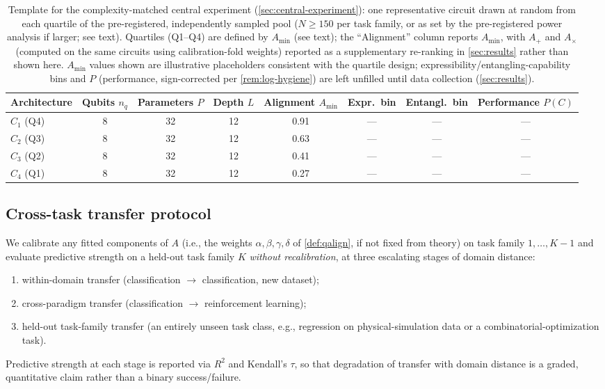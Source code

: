 \documentclass[11pt]{article}
\begin{document}
\begin{table}[htbp]
\centering
\caption{Template for the complexity-matched central experiment (\cref{sec:central-experiment}): one representative circuit drawn at random from each quartile of the pre-registered, independently sampled pool ($N \geq 150$ per task family, or as set by the pre-registered power analysis if larger; see text). Quartiles (Q1--Q4) are defined by $A_{\min}$ (see text); the ``Alignment'' column reports $A_{\min}$, with $A_+$ and $A_\times$ (computed on the same circuits using calibration-fold weights) reported as a supplementary re-ranking in \cref{sec:results} rather than shown here. $A_{\min}$ values shown are illustrative placeholders consistent with the quartile design; expressibility/entangling-capability bins and $P$ (performance, sign-corrected per \cref{rem:log-hygiene}) are left unfilled until data collection (\cref{sec:results}).}
\label{tab:central}
\begin{tabular}{@{}lccccccc@{}}
\toprule
Architecture & Qubits $n_q$ & Parameters $P$ & Depth $L$ & Alignment $A_{\min}$ & Expr.\ bin & Entangl.\ bin & Performance $P(C)$ \\
\midrule
$C_1$ (Q4) & 8 & 32 & 12 & 0.91 & --- & --- & --- \\
$C_2$ (Q3) & 8 & 32 & 12 & 0.63 & --- & --- & --- \\
$C_3$ (Q2) & 8 & 32 & 12 & 0.41 & --- & --- & --- \\
$C_4$ (Q1) & 8 & 32 & 12 & 0.27 & --- & --- & --- \\
\bottomrule
\end{tabular}
\end{table}

\subsection{Cross-task transfer protocol}
\label{sec:transfer}
We calibrate any fitted components of $A$ (i.e., the weights $\alpha,\beta,\gamma,\delta$ of \cref{def:qalign}, if not fixed from theory) on task family $1,\dots,K-1$ and evaluate predictive strength on a held-out task family $K$ \emph{without recalibration}, at three escalating stages of domain distance:
\begin{enumerate}[leftmargin=1.6em]
    \item within-domain transfer (classification $\rightarrow$ classification, new dataset);
    \item cross-paradigm transfer (classification $\rightarrow$ reinforcement learning);
    \item held-out task-family transfer (an entirely unseen task class, e.g., regression on physical-simulation data or a combinatorial-optimization task).
\end{enumerate}
Predictive strength at each stage is reported via $R^2$ and Kendall's $\tau$, so that degradation of transfer with domain distance is a graded, quantitative claim rather than a binary success/failure.
\end{document}
